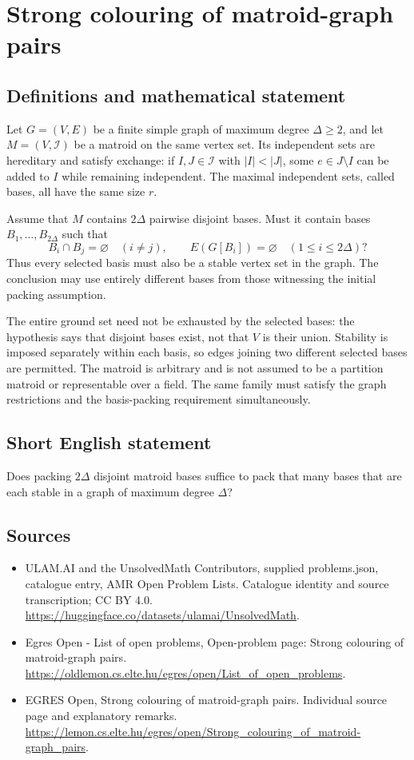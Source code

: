 \documentclass[11pt,a4paper]{article}
\begin{document}
\section*{Strong colouring of matroid-graph pairs}\label{statement}

\subsection{Definitions and mathematical statement}
Let $G=(V,E)$ be a finite simple graph of maximum degree $\Delta\ge2$,
and let $M=(V,\mathcal I)$ be a matroid on the same vertex set.
Its independent sets are hereditary and satisfy exchange: if
$I,J\in\mathcal I$ with $|I|<|J|$, some $e\in J\setminus I$ can be
added to $I$ while remaining independent. The maximal independent
sets, called bases, all have the same size $r$.

Assume that $M$ contains $2\Delta$ pairwise disjoint bases.
Must it contain bases $B_1,\ldots,B_{2\Delta}$ such that
\[
 B_i\cap B_j=\varnothing\quad(i\ne j),\qquad
                      E(G[B_i])=\varnothing\quad(1\le i\le2\Delta)?
\]
Thus every selected basis must also be a stable vertex set in the
graph. The conclusion may use entirely different bases from those
witnessing the initial packing assumption.

The entire ground set need not be exhausted by the selected bases:
the hypothesis says that disjoint bases exist, not that $V$ is their
union. Stability is imposed separately within each basis, so edges
joining two different selected bases are permitted. The matroid is
arbitrary and is not assumed to be a partition matroid or representable
over a field. The same family must satisfy the graph restrictions
and the basis-packing requirement simultaneously.
\subsection{Short English statement}
Does packing $2\Delta$ disjoint matroid bases suffice to pack
that many bases that are each stable in a graph of maximum degree $\Delta$?
\subsection{Sources}
\begin{itemize}
\item[S1] ULAM.AI and the UnsolvedMath Contributors, supplied problems.json, catalogue entry, AMR Open Problem Lists. Catalogue identity and source transcription; CC BY 4.0.
\url{https://huggingface.co/datasets/ulamai/UnsolvedMath}.
\item[S2] Egres Open - List of open problems, Open-problem page: Strong colouring of matroid-graph pairs. 
\url{https://oldlemon.cs.elte.hu/egres/open/List_of_open_problems}.
\item[S3] EGRES Open, Strong colouring of matroid-graph pairs. Individual source page and explanatory remarks.
\url{https://lemon.cs.elte.hu/egres/open/Strong_colouring_of_matroid-graph_pairs}.
\end{itemize}
\end{document}
